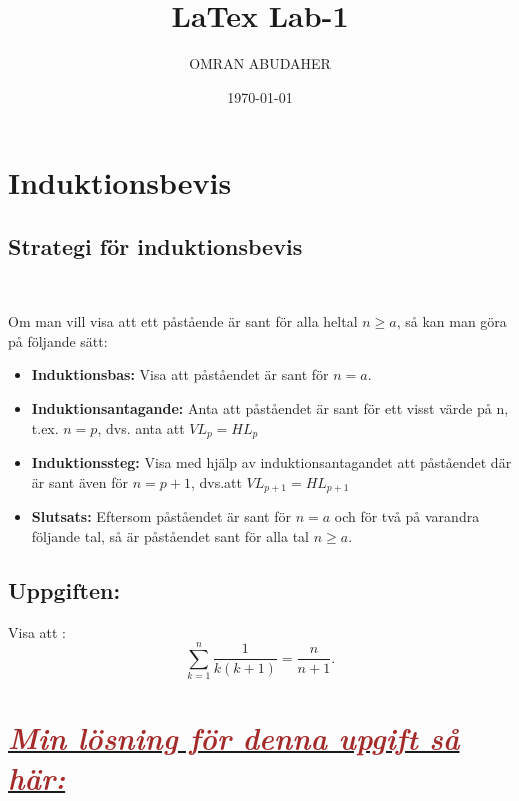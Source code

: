 \documentclass{article}
\title{LaTex Lab-1}
\author{OMRAN ABUDAHER}
\date{\today}
\begin{document}
\maketitle

\section{Induktionsbevis}
\subsection{Strategi för induktionsbevis} \

\begin{flushleft}

 Om man vill visa att ett påstående är sant för alla heltal \(n\geq a\), så kan man göra på följande sätt:

 \begin{itemize}
  \item \textcolor{Sepia}{\textbf{Induktionsbas: }} Visa att påståendet är sant för  \(n =a\).
  
  \item \textcolor{Sepia}{\textbf{Induktionsantagande: }} Anta att påståendet är sant för ett visst värde på n, t.ex. \(n = p\), dvs. anta att \(VL_{p} = HL_{p}\)
  
  \item \textcolor{Sepia}{\textbf{Induktionssteg: }} Visa med hjälp av induktionsantagandet att påståendet där är sant även för \(n = p+1\), dvs.att \(VL_{p+1} = HL_{p+1}\)

  \item \textcolor{Sepia}{\textbf{Slutsats: }} Eftersom påståendet är sant för \(n = a\) och för två på varandra följande tal, så är påståendet sant för alla tal \(n\geq a\).
  
\end{itemize}

\end{flushleft}


\subsection{Uppgiften: } 

\begin{flushleft}
 Visa att : \[
  \sum_{k=1}^n \frac{1}{k(k+1)} = \frac{n}{n+1}.
  \]
\end{flushleft} 

 \section*{\underline{\textcolor{Brown}{\textit{ Min lösning för denna upgift så här:}} }}
\end{document}
